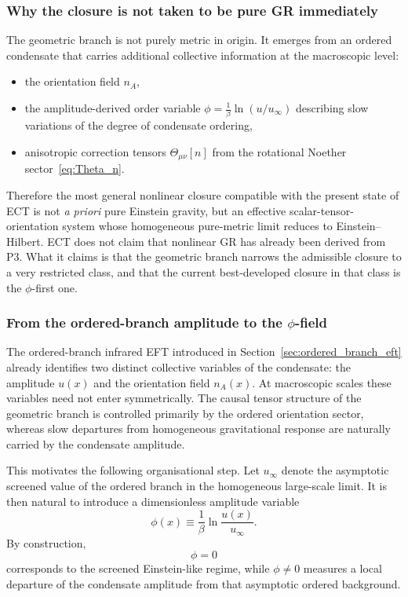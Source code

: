\documentclass[11pt,a4paper]{article}
\numberwithin{equation}{section}
\begin{document}
\subsubsection*{Why the closure is not taken to be pure GR immediately}

The geometric branch is not purely metric in origin.
It emerges from an ordered condensate that carries additional collective
information at the macroscopic level:
\begin{itemize}
  \item the orientation field $n_A$,
  \item the amplitude-derived order variable
    $\phi=\frac{1}{\beta}\ln(u/u_\infty)$ describing slow variations of the degree
    of condensate ordering,
  \item anisotropic correction tensors $\Theta_{\mu\nu}[n]$
    from the rotational Noether sector~\eqref{eq:Theta_n}.
\end{itemize}
Therefore the most general nonlinear closure compatible with the present
state of ECT is not \emph{a priori} pure Einstein gravity, but an
effective scalar-tensor-orientation system whose homogeneous
pure-metric limit reduces to Einstein--Hilbert.
ECT does not claim that nonlinear GR has already been derived from P3.
What it claims is that the geometric branch narrows the admissible
closure to a very restricted class, and that the current best-developed
closure in that class is the $\phi$-first one.

\subsubsection*{From the ordered-branch amplitude to the $\phi$-field}

The ordered-branch infrared EFT introduced in
Section~\ref{sec:ordered_branch_eft} already identifies two distinct
collective variables of the condensate:
the amplitude $u(x)$ and the orientation field $n_A(x)$.
At macroscopic scales these variables need not enter symmetrically.
The causal tensor structure of the geometric branch is controlled
primarily by the ordered orientation sector, whereas slow departures
from homogeneous gravitational response are naturally carried by the
condensate amplitude.

This motivates the following organisational step.
Let $u_\infty$ denote the asymptotic screened value of the ordered
branch in the homogeneous large-scale limit.
It is then natural to introduce a dimensionless amplitude variable
\begin{equation}
  \label{eq:phi_from_u}
  \phi(x) \equiv \frac{1}{\beta}\ln\!\frac{u(x)}{u_\infty}.
\end{equation}
By construction,
\[
\phi = 0
\]
corresponds to the screened Einstein-like regime, while
$\phi\neq0$ measures a local departure of the condensate amplitude from
that asymptotic ordered background.
\end{document}
